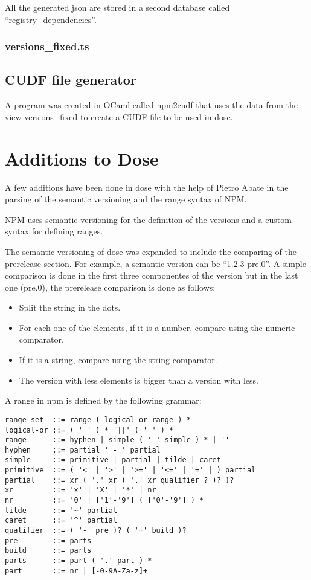 \documentclass[letterpaper,12pt]{report}
\begin{document}
All the generated json are stored in a second database called
``registry\_dependencies''.



\subsubsection{versions\_fixed.ts}


\subsection{CUDF file generator}

A program was created in OCaml called npm2cudf that uses the data from the view
versions\_fixed to create a CUDF file to be used in dose.


\section{Additions to Dose}

A few additions have been done in dose with the help of Pietro Abate in the
parsing of the semantic versioning and the range syntax of NPM.

NPM uses semantic versioning for the definition of the versions and a custom
syntax for defining ranges.

The semantic versioning of dose was expanded to include the comparing of the
prerelease section. For example, a semantic version can be ``1.2.3-pre.0''. A
simple comparison is done in the first three componentes of the version but in
the last one (pre.0), the prerelease comparison is done as follows:

\begin{itemize}
  \item Split the string in the dots.
  \item For each one of the elements, if it is a number, compare using the
    numeric comparator.
  \item If it is a string, compare using the string comparator.
  \item The version with less elements is bigger than a version with less.
\end{itemize}


A range in npm is defined by the following grammar:

\begin{verbatim}
range-set  ::= range ( logical-or range ) *
logical-or ::= ( ' ' ) * '||' ( ' ' ) *
range      ::= hyphen | simple ( ' ' simple ) * | ''
hyphen     ::= partial ' - ' partial
simple     ::= primitive | partial | tilde | caret
primitive  ::= ( '<' | '>' | '>=' | '<=' | '=' | ) partial
partial    ::= xr ( '.' xr ( '.' xr qualifier ? )? )?
xr         ::= 'x' | 'X' | '*' | nr
nr         ::= '0' | ['1'-'9'] ( ['0'-'9'] ) *
tilde      ::= '~' partial
caret      ::= '^' partial
qualifier  ::= ( '-' pre )? ( '+' build )?
pre        ::= parts
build      ::= parts
parts      ::= part ( '.' part ) *
part       ::= nr | [-0-9A-Za-z]+
\end{verbatim}
\end{document}
